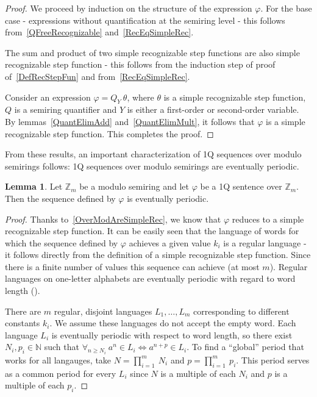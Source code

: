 \documentclass[en]{pracamgr}
\theoremstyle{definition}
\newtheorem{lemma}[theorem]{Lemma}
\begin{document}
\begin{proof}
    We proceed by induction on the structure of the expression $\varphi$. For the base case - expressions without quantification at the semiring level - this follows from~\cref{QFreeRecognizable} and~\cref{RecEqSimpleRec}. 
    
    The sum and product of two simple recognizable step functions are also simple recognizable step function - this follows from the induction step of proof of~\cref{DefRecStepFun} and from~\cref{RecEqSimpleRec}.

    Consider an expression $\varphi = Q_Y \ \theta$, where $\theta$ is a simple recognizable step function, $Q$ is a semiring quantifier and $Y$ is either a first-order or second-order variable. By lemmas~\ref{QuantElimAdd} and~\ref{QuantElimMult}, it follows that $\varphi$ is a simple recognizable step function. This completes the proof.
\end{proof}

From these results, an important characterization of 1Q sequences over modulo semirings follows: 1Q sequences over modulo semirings are eventually periodic.

\begin{lemma}
    \label{OverModAreSimpleRec2}
    Let $\mathbb{Z}_m$ be a modulo semiring and let $\varphi$ be a 1Q sentence over $\mathbb{Z}_m$. Then the sequence defined by $\varphi$ is eventually periodic.
\end{lemma}

\begin{proof}
    Thanks to~\cref{OverModAreSimpleRec}, we know that $\varphi$ reduces to a simple recognizable step function. It can be easily seen that the language of words for which the sequence defined by $\varphi$ achieves a given value $k_i$ is a regular language - it follows directly from the definition of a simple recognizable step function. Since there is a finite number of values this sequence can achieve (at most $m$). Regular languages on one-letter alphabets are eventually periodic with regard to word length (\cite[Theorem 1]{PighizziniS02}).

    There are $m$ regular, disjoint languages $L_1, \ldots, L_m$ corresponding to different constants $k_i$. We assume these languages do not accept the empty word. Each language $L_i$ is eventually periodic with respect to word length, so there exist $N_i, p_i \in \mathbb{N}$ such that $\forall_{n \geq N_i} \ a^n \in L_i \iff a^{n + p} \in L_i$. To find a ``global'' period that works for all langauges, take $N = \prod_{i=1}^m \ N_i$ and $p = \prod_{i=1}^m \ p_i$. This period serves as a common period for every $L_i$ since $N$ is a multiple of each $N_i$ and $p$ is a multiple of each $p_i$.
\end{proof}
\end{document}
